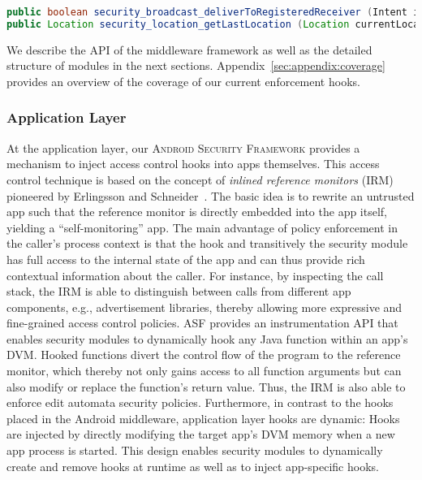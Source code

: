 \documentclass[letterpaper,twocolumn,10pt]{article}
\newcommand{\OURNAME}{\textsc{Android Security Framework}\xspace}
\newcommand{\OURSHORT}{\textsc{ASF}\xspace}
\begin{document}
\begin{lstlisting}[caption={Exemplary enforcement functions}, label={listing:hookexamples}, float, basicstyle=\footnotesize, language=Java]
public boolean security_broadcast_deliverToRegisteredReceiver (Intent intent, ComponentName targetComp, String requiredPermission, int targetUid, int targetPid, String callerPackage, ApplicationInfo callerApp, int callingUid, int callingPid);
public Location security_location_getLastLocation (Location currentLocation, LocationRequest request, int callingUid, int calingPid);
\end{lstlisting}

We describe the API of the middleware framework as well as the detailed structure of modules in the next sections. Appendix~\ref{sec:appendix:coverage} provides an overview of the coverage of our current enforcement hooks.

\subsubsection{Application Layer}

At the application layer, our \OURNAME provides a mechanism to inject access control hooks into apps themselves. This access control technique is based on the concept of \emph{inlined reference monitors} (IRM) pioneered by Erlingsson and Schneider~\cite{ErSc_00:IRMEnforcement}. The basic idea is to rewrite an untrusted app such that the reference monitor is directly embedded into the app itself, yielding a ``self-monitoring'' app. The main advantage of policy enforcement in the caller's process context is that the hook and transitively the security module has full access to the internal state of the app and can thus provide rich contextual information about the caller. For instance, by inspecting the call stack, the IRM is able to distinguish between calls from different app components, e.g., advertisement libraries, thereby allowing more expressive and fine-grained access control policies. \OURSHORT provides an instrumentation API that enables security modules to dynamically hook any Java function within an app's DVM. Hooked functions divert the control flow of the program to the reference monitor, which thereby not only gains access to all function arguments but can also modify or replace the function's return value. Thus, the IRM is also able to enforce edit automata security policies. Furthermore, in contrast to the hooks placed in the Android middleware, application layer hooks are dynamic: Hooks are injected by directly modifying the target app's DVM memory when a new app process is started. This design enables security modules to dynamically create and remove hooks at runtime as well as to inject app-specific hooks.
\end{document}
